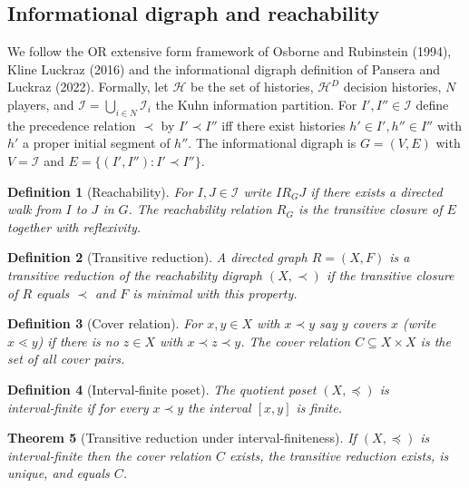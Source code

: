 \documentclass[11pt]{article}
\newtheorem{definition}{Definition}[section]
\newtheorem{theorem}[definition]{Theorem}
\begin{document}
\subsection{Informational digraph and reachability}
We follow the OR extensive form framework of Osborne and Rubinstein (1994), Kline Luckraz (2016) and the informational digraph definition of Pansera and Luckraz (2022).
Formally, let \(\mathcal H\) be the set of histories, \(\mathcal H^D\) decision
histories, \(N\) players, and \(\mathcal I=\bigcup_{i\in N}\mathcal I_i\)
the Kuhn information partition. For \(I',I''\in\mathcal I\) define the
precedence relation \(\prec\) by \(I'\prec I''\) iff there exist
histories \(h'\in I',h''\in I''\) with \(h'\) a proper initial segment of
\(h''\). The  informational digraph is \(G=(V,E)\) with \(V=\mathcal I\)
and \(E=\{(I',I''):I'\prec I''\}\).
\begin{definition}[Reachability]
For \(I,J\in\mathcal I\) write \(I R_G J\) if there exists a directed walk
from \(I\) to \(J\) in \(G\). The reachability relation \(R_G\) is the
transitive closure of \(E\) together with reflexivity.
\end{definition}

\begin{definition}[Transitive reduction]
A directed graph \(R=(X,F)\) is a \emph{transitive reduction} of the
reachability digraph \((X,\prec)\) if the transitive closure of \(R\)
equals \(\prec\) and \(F\) is minimal with this property.
\end{definition}


\begin{definition}[Cover relation]
For \(x,y\in X\) with \(x\prec y\) say \(y\) \emph{covers} \(x\) (write
\(x\lessdot y\)) if there is no \(z\in X\) with \(x\prec z\prec y\).
The cover relation \(C\subseteq X\times X\) is the set of all cover pairs.
\end{definition}





\begin{definition}[Interval‑finite poset]
The quotient poset \((X,\preceq)\) is \emph{interval‑finite} if for every
\(x\prec y\) the interval \([x,y]\) is finite.
\end{definition}


\begin{theorem}[Transitive reduction under interval‑finiteness]
If \((X,\preceq)\) is interval‑finite then the cover relation \(C\)
exists, the transitive reduction exists, is unique, and equals \(C\).
\end{theorem}
\end{document}
